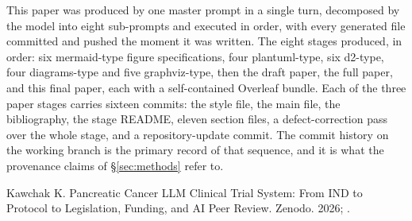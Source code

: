 This paper was produced by one master prompt in a single turn, decomposed by the
model into eight sub-prompts and executed in order, with every generated file
committed and pushed the moment it was written. The eight stages produced, in
order: six mermaid-type figure specifications, four plantuml-type, six d2-type,
four diagrams-type and five graphviz-type, then the draft paper, the full paper,
and this final paper, each with a self-contained Overleaf bundle. Each of the
three paper stages carries sixteen commits: the style file, the main file, the
bibliography, the stage README, eleven section files, a defect-correction pass
over the whole stage, and a repository-update commit. The commit history on the
working branch is the primary record of that sequence, and it is what the
provenance claims of \S\ref{sec:methods} refer to.


Kawchak K. Pancreatic Cancer LLM Clinical Trial System: From IND to Protocol to
Legislation, Funding, and AI Peer Review. Zenodo. 2026;
.

\vspace{0.2em}
\apprule{0.5pt}
\vspace{-0.1em}

\vspace{-0.35em}
\begin{apprefs}


\end{apprefs}

